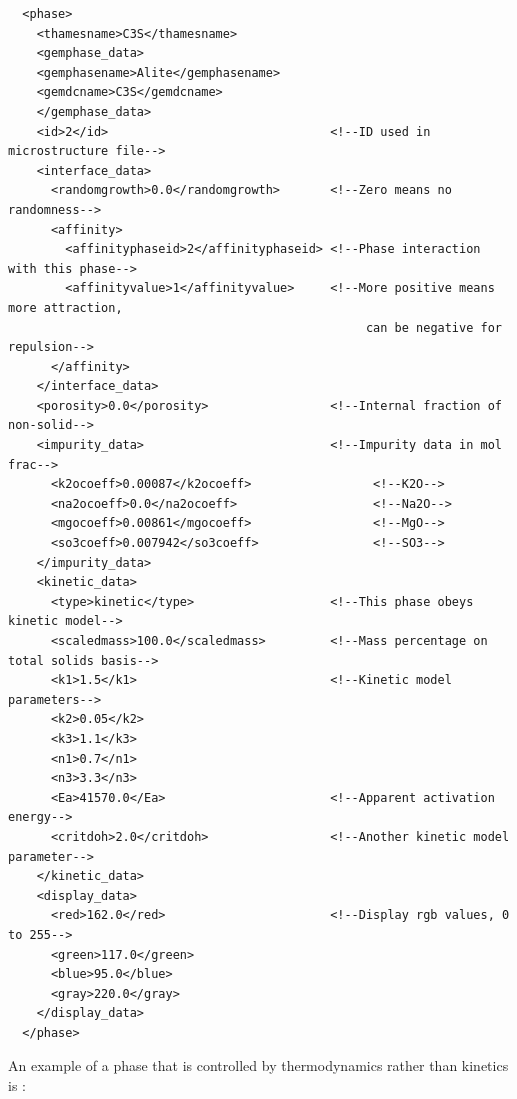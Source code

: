 \documentclass{article}
\begin{document}
\scriptsize{
    \begin{lstlisting}
  <phase>
    <thamesname>C3S</thamesname>
    <gemphase_data>
    <gemphasename>Alite</gemphasename>
    <gemdcname>C3S</gemdcname>
    </gemphase_data>
    <id>2</id>                               <!--ID used in microstructure file-->
    <interface_data>
      <randomgrowth>0.0</randomgrowth>       <!--Zero means no randomness-->
      <affinity>
        <affinityphaseid>2</affinityphaseid> <!--Phase interaction with this phase-->
        <affinityvalue>1</affinityvalue>     <!--More positive means more attraction,
                                                  can be negative for repulsion-->
      </affinity>
    </interface_data>
    <porosity>0.0</porosity>                 <!--Internal fraction of non-solid-->
    <impurity_data>                          <!--Impurity data in mol frac-->
      <k2ocoeff>0.00087</k2ocoeff>                 <!--K2O-->
      <na2ocoeff>0.0</na2ocoeff>                   <!--Na2O-->
      <mgocoeff>0.00861</mgocoeff>                 <!--MgO-->
      <so3coeff>0.007942</so3coeff>                <!--SO3-->
    </impurity_data>
    <kinetic_data>
      <type>kinetic</type>                   <!--This phase obeys kinetic model-->
      <scaledmass>100.0</scaledmass>         <!--Mass percentage on total solids basis-->
      <k1>1.5</k1>                           <!--Kinetic model parameters-->
      <k2>0.05</k2>
      <k3>1.1</k3>
      <n1>0.7</n1>
      <n3>3.3</n3>
      <Ea>41570.0</Ea>                       <!--Apparent activation energy-->
      <critdoh>2.0</critdoh>                 <!--Another kinetic model parameter-->
    </kinetic_data>
    <display_data>
      <red>162.0</red>                       <!--Display rgb values, 0 to 255-->
      <green>117.0</green>
      <blue>95.0</blue>
      <gray>220.0</gray>
    </display_data>
  </phase>
    \end{lstlisting}
}

\normalsize{ }

An example of a phase that is controlled by thermodynamics rather than
kinetics is :
\end{document}
